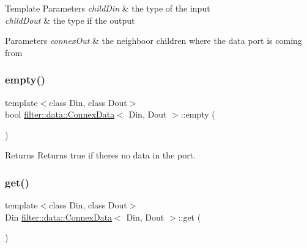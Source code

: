 \begin{DoxyTemplParams}{Template Parameters}
{\em child\+Din} & the type of the input \\
\hline
{\em child\+Dout} & the type if the output \\
\hline
\end{DoxyTemplParams}

\begin{DoxyParams}{Parameters}
{\em connex\+Out} & the neighboor children where the data port is coming from \\
\hline
\end{DoxyParams}
\mbox{\label{classfilter_1_1data_1_1_connex_data_a6ae80a4f012442066057ee23dcb6c363}} 
\subsubsection{\texorpdfstring{empty()}{empty()}}
{\footnotesize\ttfamily template$<$class Din, class Dout$>$ \\
bool \hyperlink{classfilter_1_1data_1_1_connex_data}{filter\+::data\+::\+Connex\+Data}$<$ Din, Dout $>$\+::empty (\begin{DoxyParamCaption}{ }\end{DoxyParamCaption})\hspace{0.3cm}{\ttfamily [inline]}}

\begin{DoxyReturn}{Returns}
Returns true if there\textquotesingle{}s no data in the port. 
\end{DoxyReturn}
\mbox{\label{classfilter_1_1data_1_1_connex_data_aa7d702b864f00b42b325d2eb6c0a9e91}} 
\subsubsection{\texorpdfstring{get()}{get()}}
{\footnotesize\ttfamily template$<$class Din, class Dout$>$ \\
Din \hyperlink{classfilter_1_1data_1_1_connex_data}{filter\+::data\+::\+Connex\+Data}$<$ Din, Dout $>$\+::get (\begin{DoxyParamCaption}{ }\end{DoxyParamCaption})\hspace{0.3cm}{\ttfamily [inline]}}

